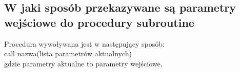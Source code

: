 \subsection{W jaki sposób przekazywane są parametry wejściowe do procedury subroutine}
Procedura wywoływana jest w następujący sposób:
\\
call nazwa(lista parametrów aktualnych)
\\
gdzie parametry aktualne to parametry wejściowe.
